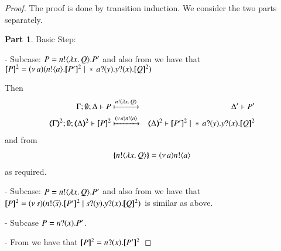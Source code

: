 \begin{proof}
	\noi The proof is done by transition induction.
	We consider the two parts separately.

	\noi \textbf{Part 1}. Basic Step:
 
	\noi - Subcase: $P= n ! \langle \lambda x.\,Q \rangle . P'$ 
	and also from 
	we have that\\
	$\pmap{P}{2} = \newsp{a}{\bout{n}{a} \pmap{P'}{2} \Par \repl{} \binp{a}{y} \binp{y}{x} \pmap{Q}{2}}$

	\noi Then
%
	\begin{eqnarray*}
		\Gamma; \es; \Delta \proves P &\hby{\bactout{n}{\abs{x}{Q}}} & \Delta' \proves P'\\
		\tmap{\Gamma}{2}; \es; \tmap{\Delta}{2} \proves \pmap{P}{2} &\hby{\news{a} \bactout{n}{a}}& \tmap{\Delta}{2} \proves \pmap{P'}{2} \Par \repl{} \binp{a}{y} \binp{y}{x} \pmap{Q}{2}
	\end{eqnarray*}
%
	\noi and from 
%
	\begin{eqnarray*}
		\{\!\!\{n ! \langle \lambda x.\,Q \rangle\}\!\!\} = (\nu\, a) n ! \langle a \rangle
	\end{eqnarray*}
%
	\noi as required.

	\noi - Subcase: $P= n ! \langle \lambda x.\,Q \rangle . P'$ 
	and also from 
	we have that\\
	$\pmap{P}{2} = \newsp{s}{\bout{n}{\dual{s}} \pmap{P'}{2} \Par \binp{s}{y} \binp{y}{x} \pmap{Q}{2}}$
	is similar as above. 

	\noi - Subcase $P = n ? (x) . P'$.

	\noi - From 
	we have that
	$\pmap{P}{2} = \binp{n}{x} \pmap{P'}{2}$


\end{proof}

